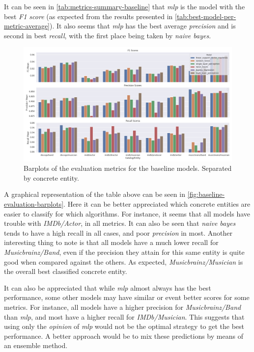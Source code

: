 \documentclass[epsfig,a4paper,11pt,titlepage,twoside,openany]{book}
\begin{document}
It can be seen in \autoref{tab:metrics-summary-baseline} that \textit{mlp} is the model with the best \textit{F1 score} (as expected from the results presented in \autoref{tab:best-model-per-metric-average}). It also seems that \textit{mlp} has the best average \textit{precision} and is second in best \textit{recall}, with the first place being taken by \textit{naive bayes}.

\begin{figure}[H]
  \centering \includegraphics[width=\textwidth]{baseline_evluation_main_metrics_barplot} 
  \caption{Barplots of the evaluation metrics for the baseline models. Separated by concrete entity.}
  \label{fig:baseline-evaluation-barplots}
\end{figure}

A graphical representation of the table above can be seen in \autoref{fig:baseline-evaluation-barplots}. Here it can be better appreciated which concrete entities are easier to classify for which algorithms. For instance, it seems that all models have trouble with \textit{IMDb/Actor}, in all metrics. It can also be seen that \textit{naive bayes} tends to have a high recall in all cases, and poor \textit{precision} in most. Another interesting thing to note is that all models have a much lower recall for \textit{Musicbrainz/Band}, even if the precision they attain for this same entity is quite good when compared against the others. As expected, \textit{Musicbrainz/Musician} is the overall best classified concrete entity. 

It can also be appreciated that while \textit{mlp} almost always has the best performance, some other models may have similar or event better scores for some metrics. For instance, all models have a higher precision for \textit{Musicbrainz/Band} than \textit{mlp}, and most have a higher recall for \textit{IMDb/Musician}. This suggests that using only the \textit{opinion} of \textit{mlp} would not be the optimal strategy to get the best performance. A better approach would be to mix these predictions by means of an ensemble method.
\end{document}

